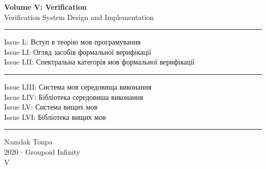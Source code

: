 \documentclass{book}
\begin{document}
\begin{titlepage}
    \centering
    \vspace*{0.5in}
    \Huge
    \textbf{Volume V: Verification} \\
    \LARGE
    Verification System Design and Implementation \\
    \vspace{1.5in}
    \small
    \flushleft
    \vspace{-2mm} \rule{\textwidth}{0.4pt}
    Issue L: Вступ в теорію мов програмування \\
    Issue LI: Огляд засобів формальної верифікації \\
    Issue LII: Спектральна категорія мов формальної верифікації \\
    \vspace{-2mm} \rule{\textwidth}{0.4pt}
    Issue LIII: Система мов середовища виконання \\
    Issue LIV: Бібліотека середовиша виконання \\
    Issue LV: Система вищих мов \\
    Issue LVI: Бібліотека вищих мов \\
    \vspace{-2mm} \rule{\textwidth}{0.4pt}
    \centering
    \vfill
    \large
    Namdak Tonpa \\
    \Large
    2020 $\cdot$ Groupoid Infinity \\
    V
\end{titlepage}

\tableofcontents
\newif\ifincludeTOC










\end{document}
